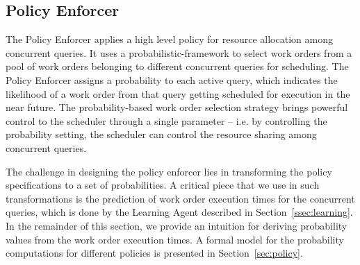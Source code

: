 %

\subsection{Policy Enforcer}\label{ssec:policy-enforcer}
The Policy Enforcer applies a high level policy for resource allocation among concurrent queries. 
It uses a probabilistic-framework to select work orders from a pool of work orders 
belonging to different concurrent queries for scheduling. 
The Policy Enforcer assigns a probability to each active query, which indicates the likelihood of a work order from that query getting scheduled for execution in the near future. 
The probability-based work order selection strategy brings powerful control to the scheduler through a single parameter -- i.e. by controlling the probability 
setting, the scheduler can control the resource sharing among concurrent queries. 

The challenge in designing the policy enforcer lies in transforming the policy specifications to a set of probabilities. 
A critical piece that we use in such transformations is the prediction of work order 
execution times for the concurrent queries, which is done by the Learning Agent described in Section~\ref{ssec:learning}. %
In the remainder of this section, we provide an intuition for deriving probability values from the work order execution times. 
A formal model for the probability computations for different policies is presented in Section~\ref{sec:policy}.

